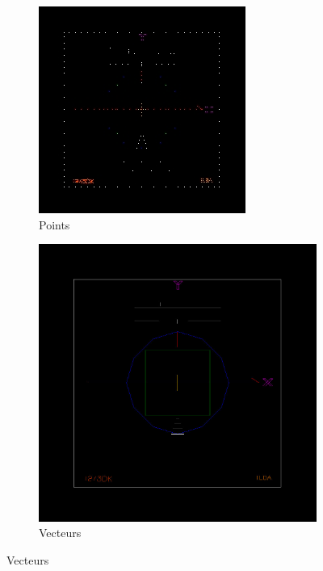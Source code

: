 \begin{fr}
\begin{figure}[ht]
	\begin{bigcenter}
        \begin{subfigure}[b]{0.6\textwidth}
                \includegraphics[width=\textwidth]{images/comp/ildatestpattern_256x256_point.jpg}
                \caption{Points}
                \label{fig:ilda_pattern_point}
        \end{subfigure}
        \begin{subfigure}[b]{0.6\textwidth}
                \includegraphics[width=\textwidth]{images/comp/ildatestpattern.jpg}
                \caption{Vecteurs}
                \label{fig:ilda_pattern_vector}
        \end{subfigure}
        

\end{bigcenter}
\end{figure}
\end{fr}
